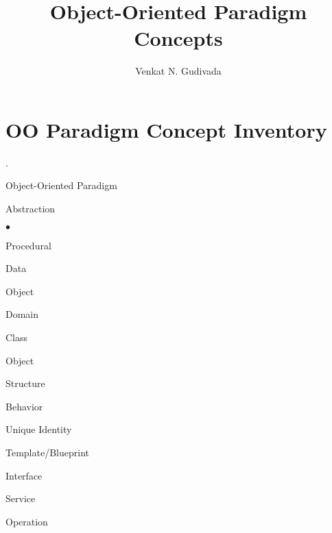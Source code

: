 \documentclass[11pt]{article}
\begin{document}

\title{Object-Oriented Paradigm Concepts}

\author{Venkat N. Gudivada}


\maketitle

\section{OO Paradigm Concept Inventory}

{\small

\begin{list}{.}%
{\itemsep 0.01in \parskip 0in \parsep 0in}

\item Object-Oriented Paradigm

\item Abstraction

    \begin{list}{$\bullet$}{\itemsep 0.01in \parskip 0in \parsep 0in}

    \item Procedural

    \item Data

    \item Object

    \item Domain

    \end{list}

\item Class

\item Object

\item Structure

\item Behavior

\item Unique Identity

\item Template/Blueprint

\item Interface

\item Service

\item Operation


\end{list}}
\end{document}
